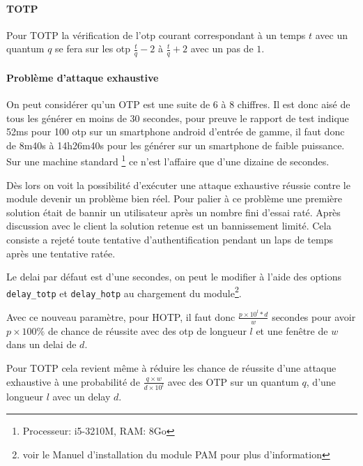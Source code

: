 \paragraph{TOTP}
Pour TOTP la vérification de l'otp courant correspondant à un temps $t$ avec un
quantum $q$ se fera sur les otp $\frac{t}{q} - 2$ à $\frac{t}{q} + 2$ avec un
pas de $1$.
\paragraph{Problème d'attaque exhaustive}
On peut considérer qu'un OTP est une suite de 6 à 8 chiffres. Il est donc aisé
de tous les générer en moins de 30 secondes, pour preuve le rapport de test
indique 52ms pour 100 otp sur un smartphone android d'entrée de gamme,
il faut donc de 8m40s à 14h26m40s pour les générer sur un smartphone de faible
puissance. Sur une machine standard \footnote{Processeur: i5-3210M, RAM: 8Go} ce
n'est l'affaire que d'une dizaine de secondes.

Dès lors on voit la possibilité d'exécuter une attaque exhaustive réussie contre
le module devenir un problème bien réel. Pour palier à ce problème une première
solution était de bannir un utilisateur après un nombre fini d'essai raté. Après
discussion avec le client la solution retenue est un bannissement limité. Cela
consiste a rejeté toute tentative d'authentification pendant un laps de temps
après une tentative ratée.

Le delai par défaut est d'une secondes, on peut le modifier à l'aide des options
\verb?delay_totp? et \verb?delay_hotp? au chargement du module\footnote{voir le
Manuel d'installation du module PAM pour plus d'information}.

Avec ce nouveau paramètre, pour HOTP, il faut donc $\frac{p\times10^{l}*d}{w}$
secondes pour avoir $p\times100\%$ de chance de réussite avec des otp de
longueur $l$ et une fenêtre de $w$ dans un delai de $d$.

Pour TOTP cela revient même à réduire les chance de réussite d'une attaque
exhaustive à une probabilité de $\frac{q\times w}{d\times10^{l}}$ avec des OTP
sur un quantum $q$, d'une longueur $l$ avec un delay $d$.

